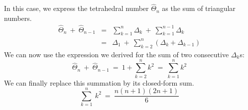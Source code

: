 \begin{itemize}
\begin{itemize}
In this case, we express the tetrahedral number $\widehat{\Theta}_n$ as the sum of triangular numbers.
\begin{eqnarray*}
\widehat{\Theta}_n \ + \ \widehat{\Theta} _{n-1} 
  & = & \sum_{k=1}^n \Delta_k \ + \ \sum_{k=1}^{n-1} \Delta_k \\
  & = & \Delta_1 \ + \ \sum_{k=2}^{n} \left( \Delta_k + \Delta_{k-1} \right)
\end{eqnarray*} 
We can now use the expression we derived for the sum of two consecutive $\Delta_k$s:
\[
\widehat{\Theta}_n \ + \ \widehat{\Theta} _{n-1} \ = \ 1 + \sum_{k=2}^{n} k^2 
\ = \ \sum_{k=1}^{n} k^2 
\]
We can finally replace this summation by its closed-form sum.
\[
\sum_{k=1}^{n} \ k^2 \ = \ \frac{n(n+1)(2n+1)}{6}
\]
  \end{itemize}
\end{itemize} 


